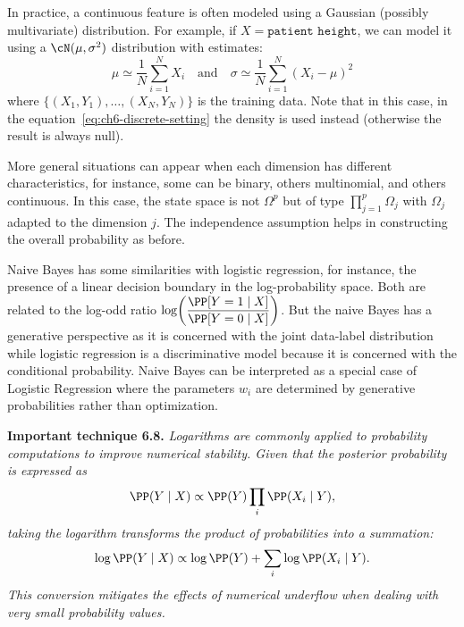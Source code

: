 In practice, a continuous feature is often modeled using a Gaussian (possibly
multivariate) distribution. For example, if $X=\texttt{patient height}$, we
can model it using a $\cN(\mu,\sigma^{2})$ distribution with estimates:
\begin{equation}\label{eq:ch6-gaussian-estimates}
  \mu\simeq \frac{1}{N}\sum_{i=1}^{N}X_{i}
  \quad\text{and}\quad
  \sigma\simeq \frac{1}{N}\sum_{i=1}^{N}(X_{i}-\mu)^{2}
\end{equation}
where $\{(X_{1},Y_{1}),\dots,(X_{N},Y_{N})\}$ is the training data. Note that
in this case, in the equation~\eqref{eq:ch6-discrete-setting} the density is
used instead (otherwise the result is always null).

\begin{remark}
More general situations can appear when each dimension has different
characteristics, for instance, some can be binary, others multinomial, and
others continuous. In this case, the state space is not $\Omega^{p}$ but of
type $\prod_{j=1}^{p}\Omega_{j}$ with $\Omega_{j}$ adapted to the dimension
$j$. The independence assumption helps in constructing the overall probability
as before.
\end{remark}

\begin{remark}
Naive Bayes has some similarities with logistic regression, for instance, the
presence of a linear decision boundary in the log-probability space. Both are
related to the log-odd ratio
$\log\!\left(\dfrac{\PP[Y=1\mid X]}{\PP[Y=0\mid X]}\right)$. But the naive
Bayes has a generative perspective as it is concerned with the joint
data-label distribution while logistic regression is a discriminative model
because it is concerned with the conditional probability. Naive Bayes can be
interpreted as a special case of Logistic Regression where the parameters
$w_{i}$ are determined by generative probabilities rather than optimization.
\end{remark}

\begin{tcolorbox}[advancedbox]
\textbf{Important technique 6.8.} \emph{Logarithms are commonly applied to
probability computations to improve numerical stability. Given that the
posterior probability is expressed as}
\begin{equation}\label{eq:ch6-log-posterior-product}
  \PP(Y\mid X)\propto \PP(Y)\prod_{i}\PP(X_{i}\mid Y),
\end{equation}
\emph{taking the logarithm transforms the product of probabilities into a
summation:}
\begin{equation}\label{eq:ch6-log-posterior-sum}
  \log\PP(Y\mid X)\propto \log\PP(Y)+\sum_{i}\log\PP(X_{i}\mid Y).
\end{equation}
\emph{This conversion mitigates the effects of numerical underflow when dealing
with very small probability values.}
\end{tcolorbox}

